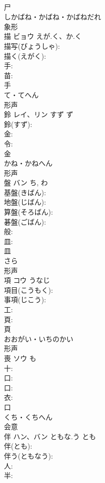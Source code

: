 \documentclass[8pt]{extreport}
\begin{document}
\begin{CJK}{UTF8}{min}
\\	尸	
\\	しかばね・かばね・かばねだれ	
\\	象形 
\\	描	ビョウ	えが.く、か.く		
\\	描写(びょうしゃ): 
\\	描く(えがく): 
\\	手: 
\\	苗: 
\\	手	
\\	て・てへん	
\\	形声 
\\	鈴	レイ、リン	すず	ず	
\\	鈴(すず): 
\\	金: 
\\	令: 
\\	金	
\\	かね・かねへん	
\\	形声 
\\	盤	バン		ち, わ	
\\	基盤(きばん): 
\\	地盤(じばん): 
\\	算盤(そろばん): 
\\	碁盤(ごばん): 
\\	般: 
\\	皿: 
\\	皿	
\\	さら	
\\	形声 
\\	項	コウ	うなじ		
\\	項目(こうもく): 
\\	事項(じこう): 
\\	工: 
\\	頁: 
\\	頁	
\\	おおがい・いちのかい	
\\	形声 
\\	喪	ソウ	も		
\\	十: 
\\	口: 
\\	口: 
\\	衣: 
\\	口	
\\	くち・くちへん	
\\	会意 
\\	伴	ハン、バン	ともな.う	とも	
\\	伴(とも): 
\\	伴う(ともなう): 
\\	人: 
\\	半: 

\end{CJK}
\end{document}
